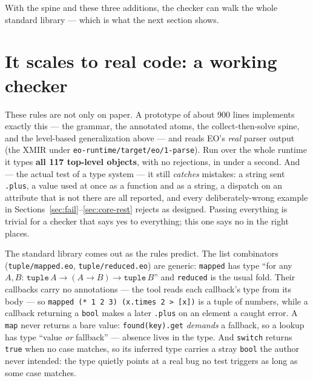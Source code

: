 \documentclass[10pt]{article}
\newcommand{\ty}[1]{\mathtt{#1}}     %
\newcommand{\arr}{\to}               %
\begin{document}
With the spine and these three additions, the checker can walk the whole
standard library --- which is what the next section shows.

\section{It scales to real code: a working checker}

These rules are not only on paper. A prototype of about 900 lines implements
exactly this --- the grammar, the annotated atoms, the collect-then-solve spine,
and the level-based generalization above --- and reads EO's \emph{real} parser
output (the XMIR under \texttt{eo-runtime/target/eo/1-parse}). Run over the whole
runtime it types \textbf{all 117 top-level objects}, with no rejections, in under
a second. And --- the actual test of a type system --- it still \emph{catches}
mistakes: a string sent \verb|.plus|, a value used at once as a function and as a
string, a dispatch on an attribute that is not there are all reported, and every
deliberately-wrong example in Sections~\ref{sec:fail}--\ref{sec:core-rest}
rejects as designed. Passing everything is trivial for a checker that says yes to
everything; this one says no in the right places.

The standard library comes out as the rules predict. The list combinators
(\texttt{tuple/mapped.eo}, \texttt{tuple/reduced.eo}) are generic: \verb|mapped|
has type ``for any $A,B$: $\ty{tuple}\,A \arr (A\arr B) \arr \ty{tuple}\,B$'' and
\verb|reduced| is the usual fold. Their callbacks carry no annotations --- the
tool reads each callback's type from its body --- so
\verb|mapped (* 1 2 3) (x.times 2 > [x])| is a tuple of numbers, while a callback
returning a \verb|bool| makes a later \verb|.plus| on an element a caught error.
A \verb|map| never returns a bare value: \verb|found(key).get| \emph{demands} a
fallback, so a lookup has type ``value \emph{or} fallback'' --- absence lives in
the type. And \verb|switch| returns \verb|true| when no case matches, so its
inferred type carries a stray \verb|bool| the author never intended: the type
quietly points at a real bug no test triggers as long as some case matches.
\end{document}
